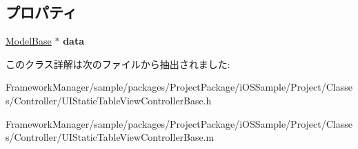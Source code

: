 \subsection*{プロパティ}
\begin{DoxyCompactItemize}
\item 
\hypertarget{interface_u_i_static_table_view_controller_base_ad18f6fb6b19268a90fcd3f0620190970}{}\hyperlink{interface_model_base}{Model\+Base} $\ast$ {\bfseries data}\label{interface_u_i_static_table_view_controller_base_ad18f6fb6b19268a90fcd3f0620190970}

\end{DoxyCompactItemize}


このクラス詳解は次のファイルから抽出されました\+:\begin{DoxyCompactItemize}
\item 
Framework\+Manager/sample/packages/\+Project\+Package/i\+O\+S\+Sample/\+Project/\+Classes/\+Controller/U\+I\+Static\+Table\+View\+Controller\+Base.\+h\item 
Framework\+Manager/sample/packages/\+Project\+Package/i\+O\+S\+Sample/\+Project/\+Classes/\+Controller/U\+I\+Static\+Table\+View\+Controller\+Base.\+m\end{DoxyCompactItemize}
